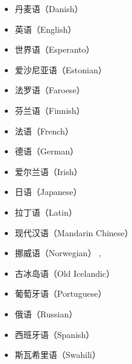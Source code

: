 \begin{itemize}
\item 丹麦语（Danish）       \citep{Bick2001a-u,BN2007a-u}
\item 英语（English）     \citep{MIF85a,SN86a,LR87a,Hudson89a,ST91a-u,VHA92a-u,IKKLP92a-u,Coch96a}
\item 世界语（Esperanto） \citep{Bick2009a-u} 
\item 爱沙尼亚语（Estonian）   \citep*{Mueuerisep99a-u,MPMKRU2003a-u}
\item 法罗语（Faroese）     \citep{Trosterud2009a-u}
\item 芬兰语（Finnish）     \citep*{NJL84a-u,JLV86a-u}
\item 法语（French）       \citep{IKKLP92a-u,Coch96a,Bick2010a-u}
\item 德语（German）       \citep{Hellwig86a-u,Coch96a,HKMS98a-u,MS98c-u,Hellwig2003a,Hellwig2006a,GK2001a}
\item 爱尔兰语（Irish）         \citep{DvG2006a-u}
\item 日语（Japanese）   \citep*{MIF85a}
\item 拉丁语（Latin）         \citep{Covington90a}
\item 现代汉语（Mandarin Chinese） \citep{LW2006a-u,Liu2009a-u}
\item 挪威语（Norwegian）               \citep*{HBN2000a-u},
\item 古冰岛语（Old Icelandic）       \citep{Maas77a}
\item 葡萄牙语（Portuguese）             \citep{Bick2003a-u} 
\item 俄语（Russian）                   \citep{HZ60a-u,Melcuk64a-u,Covington90a}
\item 西班牙语（Spanish）                   \citep{Coch96a,Bick2006a-u}
\item 斯瓦希里语（Swahili）                   \citep{Hurskainen2006a-u}

\end{itemize}
